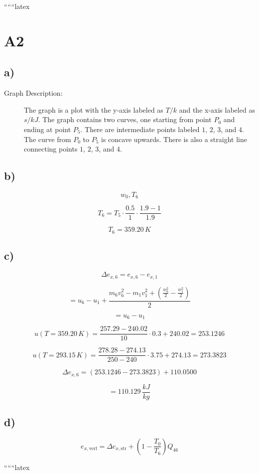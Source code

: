 
``````latex


\section*{A2}

\subsection*{a)}

\begin{description}
    \item[Graph Description:] The graph is a plot with the y-axis labeled as $T/k$ and the x-axis labeled as $s/kJ$. The graph contains two curves, one starting from point $P_0$ and ending at point $P_5$. There are intermediate points labeled $1$, $2$, $3$, and $4$. The curve from $P_0$ to $P_5$ is concave upwards. There is also a straight line connecting points $1$, $2$, $3$, and $4$.
\end{description}

\subsection*{b)}

\[
w_0, T_6
\]

\[
T_6 = T_5 \cdot \frac{0.5}{1} \cdot \frac{1.9 - 1}{1.9}
\]

\[
T_6 = 359.20 \, K
\]

\subsection*{c)}

\[
\Delta e_{x,6} = e_{x,6} - e_{x,1}
\]

\[
= u_6 - u_1 + \frac{m_6 v_6^2 - m_1 v_1^2 + \left( \frac{w_6^2}{2} - \frac{w_1^2}{2} \right)}{2}
\]

\[
= u_6 - u_1
\]

\[
u(T = 359.20 \, K) = \frac{257.29 - 240.02}{10} \cdot 0.3 + 240.02 = 253.1246
\]

\[
u(T = 293.15 \, K) = \frac{278.28 - 274.13}{250 - 240} \cdot 3.75 + 274.13 = 273.3823
\]

\[
\Delta e_{x,6} = (253.1246 - 273.3823) + 110.0500
\]

\[
= 110.129 \, \frac{kJ}{kg}
\]

\subsection*{d)}

\[
e_{x, \text{verl}} = \Delta e_{x, \text{str}} + \left( 1 - \frac{T_0}{T_6} \right) Q_{46}
\]

``````latex


